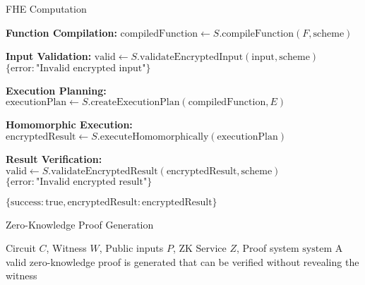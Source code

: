 \begin{tcolorbox}
\begin{tcolorbox}
\begin{tcolorbox}
\begin{protocol}{FHE Computation}
\begin{algorithmic}[1]
\State \textbf{Function Compilation:}
\State $\text{compiledFunction} \gets S.\text{compileFunction}(F, \text{scheme})$

\State \textbf{Input Validation:}
    \State $\text{valid} \gets S.\text{validateEncryptedInput}(\text{input}, \text{scheme})$
        \State \Return $\{\text{error}: \text{"Invalid encrypted input"}\}$
    \EndIf
\EndFor

\State \textbf{Execution Planning:}
\State $\text{executionPlan} \gets S.\text{createExecutionPlan}(\text{compiledFunction}, E)$

\State \textbf{Homomorphic Execution:}
\State $\text{encryptedResult} \gets S.\text{executeHomomorphically}(\text{executionPlan})$

\State \textbf{Result Verification:}
\State $\text{valid} \gets S.\text{validateEncryptedResult}(\text{encryptedResult}, \text{scheme})$
    \State \Return $\{\text{error}: \text{"Invalid encrypted result"}\}$
\EndIf

\State \Return $\{\text{success}: \text{true}, \text{encryptedResult}: \text{encryptedResult}\}$
\end{algorithmic}
\end{protocol}
\end{tcolorbox}


\begin{tcolorbox}[
    enhanced,
    colback=blue!5!white,
    colframe=blue!75!black,
    arc=5mm,
    boxrule=1.5pt,
    title=Advanced Crypto Protocol,
    fonttitle=\bfseries,
    coltitle=white,
    attach boxed title to top left={yshift=-2mm, xshift=5mm},
    boxed title style={colback=blue!75!black, rounded corners},
    shadow={2mm}{-2mm}{0mm}{black!50},
    drop fuzzy shadow
]
\begin{tcolorbox}[
    enhanced,
    colback=blue!5!white,
    colframe=blue!75!black,
    arc=5mm,
    boxrule=1.5pt,
    title=Protocol,
    fonttitle=\bfseries,
    coltitle=white,
    attach boxed title to top left={yshift=-2mm, xshift=5mm},
    boxed title style={colback=blue!75!black, rounded corners},
    shadow={2mm}{-2mm}{0mm}{black!50},
    drop fuzzy shadow
]
\begin{protocol}{Zero-Knowledge Proof Generation}
\label{prot:zk-proof-generation}
\begin{algorithmic}[1]
\Require Circuit $C$, Witness $W$, Public inputs $P$, ZK Service $Z$, Proof system $\text{system}$
\Ensure A valid zero-knowledge proof is generated that can be verified without revealing the witness


\end{algorithmic}
\end{protocol}
\end{tcolorbox}
\end{tcolorbox}
\end{tcolorbox}
\end{tcolorbox}
